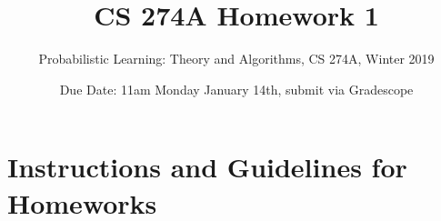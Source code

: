 \documentclass[11pt]{article}
\begin{document}
\setlength{\parskip}{1.2ex plus0.3ex minus 0.3ex}


\thispagestyle{empty} \pagestyle{myheadings} 



\title{CS 274A Homework 1}
\author{Probabilistic Learning: Theory and Algorithms, CS 274A, Winter 2019}
\date{Due Date:  11am Monday January 14th, submit via Gradescope}

\maketitle


\section*{Instructions and Guidelines for Homeworks}
\end{document}
